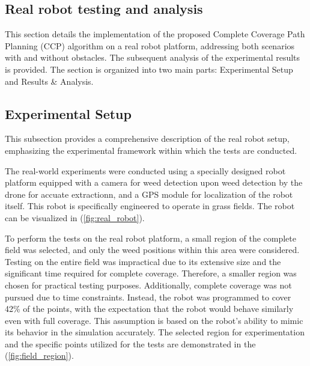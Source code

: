 
\subsection{Real robot testing and analysis} 

This section details the implementation of the proposed Complete Coverage Path Planning (CCP) algorithm on a real robot platform, addressing both scenarios with and without obstacles. The subsequent analysis of the experimental results is provided. The section is organized into two main parts: Experimental Setup and Results \& Analysis. 

\subsection{Experimental Setup} 

This subsection provides a comprehensive description of the real robot setup, emphasizing the experimental framework within which the tests are conducted.   

\vspace*{6mm}   


The real-world experiments were conducted using a specially designed robot platform equipped with a camera for weed detection upon weed detection by the drone for accuate extractionn, and a GPS module for localization of the robot itself. This robot is specifically engineered to operate in grass fields. The robot can be visualized in (\autoref{fig:real_robot}).   


\vspace*{6mm}   


To perform the tests on the real robot platform, a small region of the complete field was selected, and only the weed positions within this area were considered. Testing on the entire field was impractical due to its extensive size and the significant time required for complete coverage. Therefore, a smaller region was chosen for practical testing purposes. Additionally, complete coverage was not pursued due to time constraints. Instead, the robot was programmed to cover 42\% of the points, with the expectation that the robot would behave similarly even with full coverage. This assumption is based on the robot's ability to mimic its behavior in the simulation accurately. The selected region for experimentation and the specific points utilized for the tests are demonstrated in the (\autoref{fig:field_region}). 


